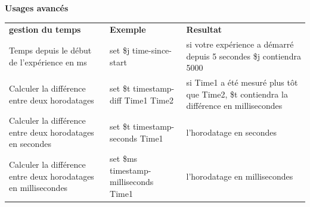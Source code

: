 \documentclass[
]{book}
\begin{document}
\textbf{Usages avancés}

\begin{longtable}[]{@{}lll@{}}
\toprule
\endhead
\begin{minipage}[t]{0.30\columnwidth}\raggedright
\textbf{gestion du temps}\strut
\end{minipage} & \begin{minipage}[t]{0.19\columnwidth}\raggedright
\textbf{Exemple}\strut
\end{minipage} & \begin{minipage}[t]{0.42\columnwidth}\raggedright
\textbf{Resultat}\strut
\end{minipage}\tabularnewline
\begin{minipage}[t]{0.30\columnwidth}\raggedright
Temps depuis le début de l'expérience en ms\strut
\end{minipage} & \begin{minipage}[t]{0.19\columnwidth}\raggedright
set \$j time-since-start\strut
\end{minipage} & \begin{minipage}[t]{0.42\columnwidth}\raggedright
si votre expérience a démarré depuis 5 secondes \$j contiendra 5000\strut
\end{minipage}\tabularnewline
\begin{minipage}[t]{0.30\columnwidth}\raggedright
Calculer la différence entre deux horodatages\strut
\end{minipage} & \begin{minipage}[t]{0.19\columnwidth}\raggedright
set \$t timestamp-diff Time1 Time2\strut
\end{minipage} & \begin{minipage}[t]{0.42\columnwidth}\raggedright
si Time1 a été mesuré plus tôt que Time2, \$t contiendra la différence en millisecondes\strut
\end{minipage}\tabularnewline
\begin{minipage}[t]{0.30\columnwidth}\raggedright
Calculer la différence entre deux horodatages en secondes\strut
\end{minipage} & \begin{minipage}[t]{0.19\columnwidth}\raggedright
set \$t timestamp-seconds Time1\strut
\end{minipage} & \begin{minipage}[t]{0.42\columnwidth}\raggedright
l'horodatage en secondes\strut
\end{minipage}\tabularnewline
\begin{minipage}[t]{0.30\columnwidth}\raggedright
Calculer la différence entre deux horodatages en millisecondes\strut
\end{minipage} & \begin{minipage}[t]{0.19\columnwidth}\raggedright
set \$ms timestamp-milliseconds Time1\strut
\end{minipage} & \begin{minipage}[t]{0.42\columnwidth}\raggedright
l'horodatage en millisecondes\strut
\end{minipage}\tabularnewline
\bottomrule
\end{longtable}
\end{document}
